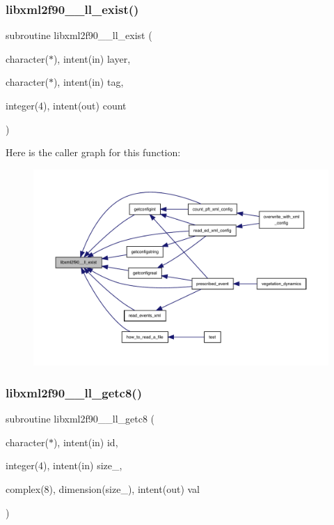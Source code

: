 \subsubsection{\texorpdfstring{libxml2f90\+\_\+\+\_\+ll\+\_\+exist()}{libxml2f90\_\_ll\_exist()}}
{\footnotesize\ttfamily subroutine libxml2f90\+\_\+\+\_\+ll\+\_\+exist (\begin{DoxyParamCaption}\item[{character($\ast$), intent(in)}]{layer,  }\item[{character($\ast$), intent(in)}]{tag,  }\item[{integer(4), intent(out)}]{count }\end{DoxyParamCaption})}

Here is the caller graph for this function\+:
\nopagebreak
\begin{figure}[H]
\begin{center}
\leavevmode
\includegraphics[width=350pt]{libxml2f90_8f90__pp_8f90_a3693c7841e7cf085873b2193e4eb51cf_icgraph}
\end{center}
\end{figure}
\mbox{\label{libxml2f90_8f90__pp_8f90_a5d4a74ac67abc4657d96bcc55fad78f3}} 
\subsubsection{\texorpdfstring{libxml2f90\+\_\+\+\_\+ll\+\_\+getc8()}{libxml2f90\_\_ll\_getc8()}}
{\footnotesize\ttfamily subroutine libxml2f90\+\_\+\+\_\+ll\+\_\+getc8 (\begin{DoxyParamCaption}\item[{character($\ast$), intent(in)}]{id,  }\item[{integer(4), intent(in)}]{size\+\_\+,  }\item[{complex(8), dimension(size\+\_\+), intent(out)}]{val }\end{DoxyParamCaption})}

